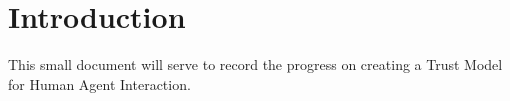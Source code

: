 \section{Introduction}
\label{sec:Introduction}
This small document will serve to record the progress on creating a Trust Model for Human Agent Interaction. 

